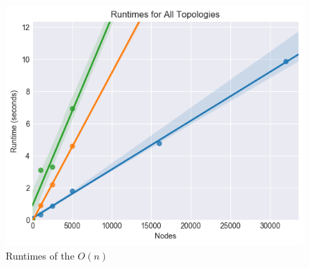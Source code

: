 \documentclass{article}
\begin{document}
  \begin{figure}[H]

    \includegraphics[width=1 \textwidth]{shared/runtime/running_times}
    \caption{Runtimes of the $O(n)$ }
  \end{figure}

\printbibliography
\end{document}
